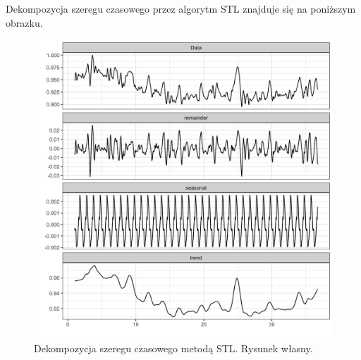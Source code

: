 \documentclass{article}
\begin{document}





Dekompozycja szeregu czasowego przez algorytm STL znajduje się na
poniższym obrazku.

\begin{figure}[H]
\centering
\includegraphics[width=\textwidth]{./images/stl-usage.png}
\caption{Dekompozycja szeregu czasowego metodą STL. Rysunek własny.}
\end{figure}
\end{document}
